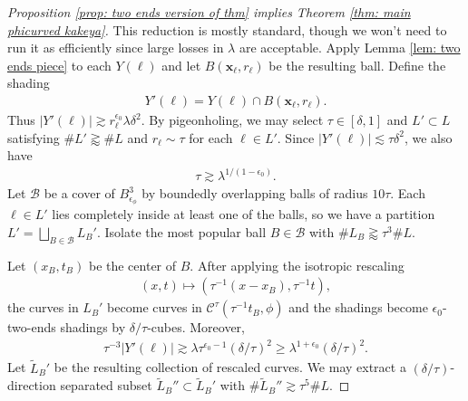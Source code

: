 \documentclass[12pt]{amsart}
\newcommand{\x}{{\bf{x}}}
\numberwithin{equation}{section}
\newcommand{\1}{\mathbbm{1}}
\renewcommand{\x}{\mathbf x}
\newcommand{\Bphi}{B_{\epsilon_\phi}}
\begin{document}
\begin{proof}[Proposition \ref{prop: two ends version of thm} implies Theorem \ref{thm: main phicurved kakeya}]
    
    This reduction is mostly standard, though we won't need to run it as efficiently since large losses in $\lambda$ are acceptable. Apply Lemma \ref{lem: two ends piece} to each $Y(\ell)$ and let $B(\x_\ell, r_\ell)$ be the resulting ball. Define the shading 
    \begin{align}
        Y'(\ell) = Y(\ell) \cap B(\x_\ell, r_\ell).
    \end{align}
    Thus $|Y'(\ell)| \gtrsim r_{\ell}^{\epsilon_0} \lambda \delta^2$. By pigeonholing, we may select $\tau \in [\delta, 1]$ and $L' \subset L$ satisfying  $\# L' \gtrapprox \# L$ and $r_\ell \sim \tau$ for each $\ell \in L'$. Since 
    $|Y'(\ell)| \lesssim \tau \delta^2$,
    we also have 
    \begin{align}
        \tau \gtrsim \lambda^{1/(1-\epsilon_0)}.
    \end{align}
    Let $\mathcal B$ be a cover of $\Bphi^3$ by boundedly overlapping balls of radius $10 \tau$. Each $\ell \in L'$ lies completely inside at least one of the balls, so we have a partition $L' = \bigsqcup_{B \in \mathcal B} L_B'$. Isolate the most popular ball $B \in \mathcal B$ with $\# L_B \gtrapprox \tau^{3} \#L$.

    Let $(x_B,t_B)$ be the center of $B$. After applying the isotropic rescaling 
    \begin{align}
        (x,t) \mapsto (\tau^{-1}(x-x_B), \tau^{-1}t),
    \end{align}
    the curves in $L_B'$ become curves in $\mathcal C^\tau(\tau^{-1}t_B, \phi)$ and the shadings become $\epsilon_0$-two-ends shadings by $\delta/\tau$-cubes. Moreover, 
    \begin{align}
        \tau^{-3} |Y'(\ell)| \gtrsim \lambda \tau^{\epsilon_0-1} (\delta/\tau)^2 \geq \lambda^{1+\epsilon_0} (\delta/\tau)^2.
    \end{align}
    Let $\tilde L_B'$ be the resulting collection of rescaled curves. We may extract a $(\delta/\tau)$-direction separated subset $\tilde L_B'' \subset \tilde L_B'$ with $\# \tilde L_B'' \gtrsim \tau^5 \#L$. 


\end{proof}
\end{document}
